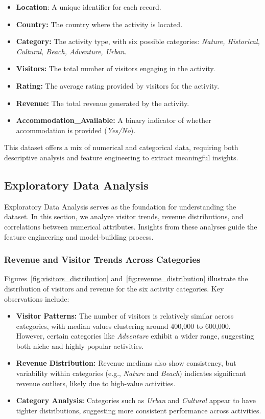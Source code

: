 \documentclass{article}
\begin{document}
\begin{itemize}
    \item \textbf{Location}: A unique identifier for each record.
    \item \textbf{Country:} The country where the activity is located.
    \item \textbf{Category:} The activity type, with six possible categories:
          \textit{Nature, Historical, Cultural, Beach, Adventure, Urban}.
    \item \textbf{Visitors:} The total number of visitors engaging in the activity.
    \item \textbf{Rating:} The average rating provided by visitors for the activity.
    \item \textbf{Revenue:} The total revenue generated by the activity.
    \item \textbf{Accommodation\_Available:} A binary indicator of whether accommodation is provided (\textit{Yes/No}).
\end{itemize}

This dataset offers a mix of numerical and categorical data, requiring both descriptive analysis and feature engineering to extract meaningful insights.

\subsection{Exploratory Data Analysis}
Exploratory Data Analysis serves as the foundation for understanding the dataset. In this section, we analyze visitor trends, revenue distributions, and correlations between numerical attributes. Insights from these analyses guide the feature engineering and model-building process.

\subsubsection{Revenue and Visitor Trends Across Categories}
Figures~\ref{fig:visitors_distribution} and~\ref{fig:revenue_distribution} illustrate the distribution of visitors and revenue for the six activity categories. Key observations include:
\begin{itemize}
    \item \textbf{Visitor Patterns:} The number of visitors is relatively similar across categories, with median values clustering around 400,000 to 600,000. However, certain categories like \textit{Adventure} exhibit a wider range, suggesting both niche and highly popular activities.
    \item \textbf{Revenue Distribution:} Revenue medians also show consistency, but variability within categories (e.g., \textit{Nature} and \textit{Beach}) indicates significant revenue outliers, likely due to high-value activities.
    \item \textbf{Category Analysis:} Categories such as \textit{Urban} and \textit{Cultural} appear to have tighter distributions, suggesting more consistent performance across activities.
\end{itemize}
\end{document}
